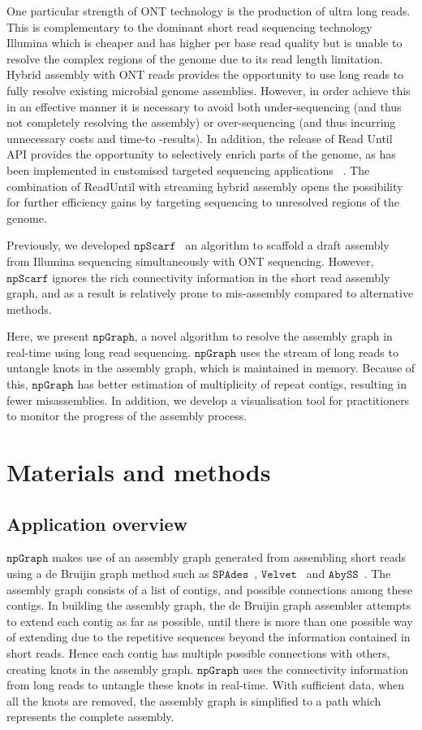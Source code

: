 \documentclass[10pt,letterpaper]{article}
\newcommand{\npscarf}{$\mathtt{npScarf}$}
\newcommand{\npgraph}{$\mathtt{npGraph}$}
\newcommand{\spades}{$\mathtt{SPAdes}$}
\begin{document}
One particular strength of ONT technology is the production of ultra long reads. 
This is complementary to the dominant short read sequencing technology Illumina which is cheaper and has higher per base read quality but is unable to resolve the complex regions of the genome due to its read length limitation. 
Hybrid assembly with ONT reads provides the opportunity to use long reads to fully resolve existing microbial genome assemblies. However, in order achieve this in an effective manner it is necessary to avoid both under-sequencing (and thus not completely resolving the assembly) or over-sequencing (and thus incurring unnecessary costs and time-to -results).  In addition, the release of Read Until API provides the opportunity to selectively enrich parts of the genome, as has been implemented in customised targeted sequencing applications ~\cite{Payne2020}.   The combination of ReadUntil with  streaming hybrid assembly opens the possibility for further efficiency gains by targeting sequencing to unresolved regions of the genome.

Previously, we developed \npscarf{}~\cite{Cao2017scaffolding} an algorithm to scaffold a draft assembly from Illumina sequencing simultaneously with ONT sequencing.  However, \npscarf{} ignores the rich connectivity information in the short read assembly graph, and as a result is relatively prone to mis-assembly compared to alternative methods.

Here, we present \npgraph{}, a novel algorithm to resolve the assembly graph in real-time using long read 
sequencing. \npgraph{} uses the stream of long reads to untangle knots in the assembly graph, which is maintained in memory.
Because of this, \npgraph{} has better estimation of multiplicity of repeat contigs, resulting in fewer misassemblies. 
In addition, we develop a visualisation tool for practitioners to monitor
the progress of the assembly process.


\section*{Materials and methods}
\subsection*{Application overview}
\npgraph{} makes use of an assembly graph generated from assembling short reads using a de Bruijin
graph method such as \spades{}~\cite{BankevichNA2012}, $\mathtt{Velvet}$~\cite{Zerbino2008}
and $\mathtt{AbySS}$~\cite{Simpson2009}. The assembly graph consists of a list of contigs, and 
possible connections among these contigs. In building the assembly graph, the de Bruijin graph assembler attempts to extend 
each contig as far as possible, until there is more than one possible way of extending due to the repetitive sequences 
beyond the information contained in short reads. Hence each contig has multiple possible connections with others,
 creating knots in the assembly graph. \npgraph{}  uses the connectivity information from long reads to untangle these knots in real-time. 
 With sufficient data, when all the knots are removed, the assembly graph is simplified 
to a path which represents the complete assembly.
\end{document}
